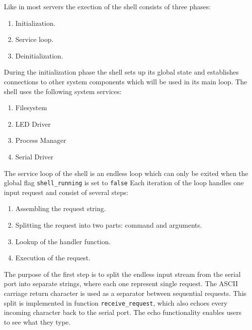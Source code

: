 \documentclass[a4paper,10pt]{article}
\begin{document}
Like in most servers the exection of the shell consists of three phases:
\begin{enumerate}
	\item Initialization.
	\item Service loop.
	\item Deinitialization.
\end{enumerate}

During the initialization phase the shell sets up its global state and establishes connections to other system components which will be used in its main loop.
The shell uses the following system services:
\begin{enumerate}
	\item Filesystem
	\item LED Driver
	\item Process Manager
	\item Serial Driver
\end{enumerate}

The service loop of the shell is an endless loop which can only be exited when the global flag \lstinline!shell_running! is set to \lstinline!false!
Each iteration of the loop handles one input request and consist of several steps:
\begin{enumerate}
	\item Assembling the request string.
	\item Splitting the request into two parts: command and arguments.
	\item Lookup of the handler function.
	\item Execution of the request.
\end{enumerate} 

The purpose of the first step is to split the endless input stream from the serial port into separate strings, where each one represent single request.
The ASCII carriage return character is used as a separator between sequential requests.
This split is implemented in function \lstinline!receive_request!, which also echoes every incoming character back to the serial port.
The echo functionality enables users to see what they type.
\end{document}
